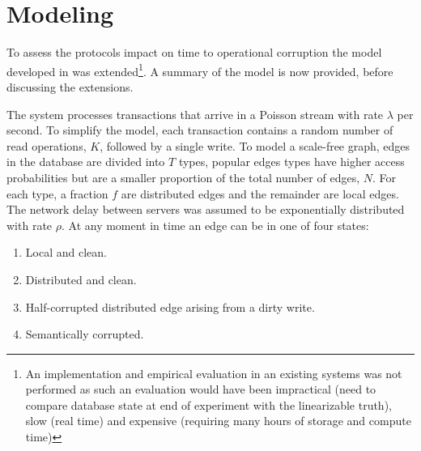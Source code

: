 \documentclass[sigplan,10pt]{acmart}
\begin{document}
\section{Modeling}
\label{sec:modeling}

To assess the protocols impact on time to operational corruption the model developed in \cite{Ezhilchelvan2018} was extended\footnote{An implementation and empirical evaluation in an existing systems was not performed as such an evaluation would have been impractical (need to compare database state at end of experiment with the linearizable truth), slow (real time) and expensive (requiring many hours of storage and compute time)}. A summary of the model is now provided, before discussing the extensions.

The system processes transactions that arrive in a Poisson stream with rate $\lambda$ per second. To simplify the model, each transaction contains a random number of read operations, $K$, followed by a single write. To model a scale-free graph, edges in the database are divided into $T$ types, popular edges types have higher access probabilities but are a smaller proportion of the total number of edges, $N$. For each type, a fraction $f$ are distributed edges and the remainder are local edges. The network delay between servers was assumed to be exponentially distributed with rate $\rho$. At any moment in time an edge can be in one of four states:
\begin{enumerate}
\item Local and clean.
\item Distributed and clean.
\item Half-corrupted distributed edge arising from a dirty write.
\item Semantically corrupted.
\end{enumerate}

\end{document}
